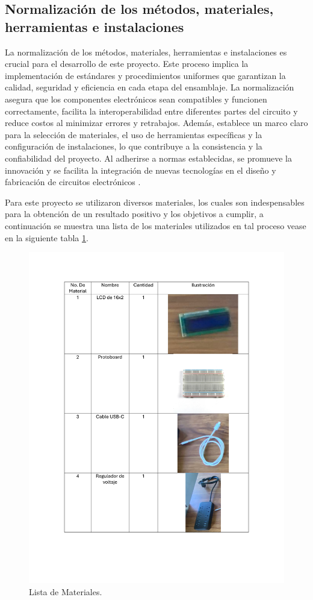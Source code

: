 \subsection{Normalización de los métodos, materiales, herramientas e instalaciones}
% 
La normalización de los métodos, materiales, herramientas e instalaciones es crucial para el desarrollo de este proyecto. Este proceso implica la implementación de estándares y procedimientos uniformes que garantizan la calidad, seguridad y eficiencia en cada etapa del ensamblaje. La normalización asegura que los componentes electrónicos sean compatibles y funcionen correctamente, facilita la interoperabilidad entre diferentes partes del circuito y reduce costos al minimizar errores y retrabajos. Además, establece un marco claro para la selección de materiales, el uso de herramientas específicas y la configuración de instalaciones, lo que contribuye a la consistencia y la confiabilidad del proyecto. Al adherirse a normas establecidas, se promueve la innovación y se facilita la integración de nuevas tecnologías en el diseño y fabricación de circuitos electrónicos \cite{normalización}.

Para este proyecto se utilizaron diversos materiales, los cuales son indespensables para la obtención de un resultado positivo y los objetivos a cumplir, a continuación se muestra una lista de los materiales utilizados en tal proceso vease en la siguiente tabla \ref{fig:listaDeMateriales}.

\begin{figure}[H]
    \centering
    \includegraphics[scale=0.22]{15/img/listaDeMateriales.pdf}
    \caption{Lista de Materiales.}
    \label{fig:listaDeMateriales}
\end{figure}

